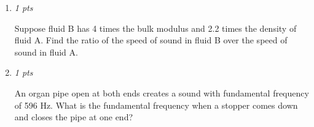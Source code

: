 \documentclass[11pt]{article}
\begin{document}
\begin{enumerate}[leftmargin=*,label=\textbf{Question \arabic*.}]
\item \hfill \textit{1 pts}

Suppose fluid B has 4 times the bulk modulus and 2.2 times the density of fluid A. Find the ratio of the speed of sound in fluid B over the speed of sound in fluid A.

\item \hfill \textit{1 pts}

An organ pipe open at both ends creates a sound with fundamental frequency of 596 Hz. What is the fundamental frequency when a stopper comes down and closes the pipe at one end?

\end{enumerate}
\end{document}

